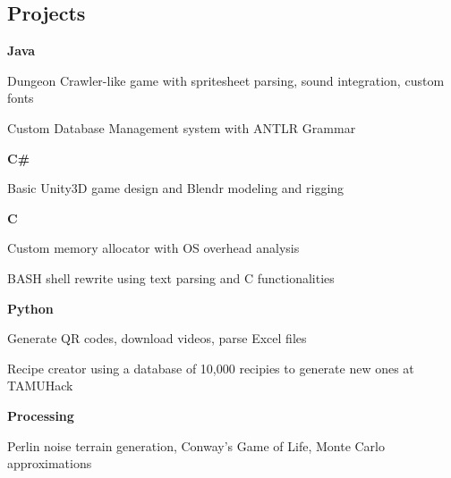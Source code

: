 \documentclass[10pt,letterpaper]{article}
\newenvironment{indentsection}[1]%
{\begin{list}{}%
	{\setlength{\leftmargin}{#1}}%
	\item[]%
}
{\end{list}}
\newcommand{\CPP}
{C\nolinebreak[4]\hspace{-.05em}\raisebox{.22ex}{\footnotesize\bf ++}}
\begin{document}
\subsection*{Projects}
\begin{indentsection}{\parindent}
	\begin{itemize*}
	\item \textbf{Java} 
	\vspace{-0.2em}
		\begin{itemize*}
			\item Dungeon Crawler-like game with spritesheet parsing, sound integration, custom fonts 
			\item Custom Database Management system with ANTLR Grammar 
		\end{itemize*}
	\item \textbf{C\#} 
	\vspace{-0.2em}
		\begin{itemize*}
			\item Basic Unity3D game design and Blendr modeling and rigging 
		\end{itemize*}
	\item \textbf{\CPP}
	\vspace{-0.2em}
		\begin{itemize*}
			\item Custom memory allocator with OS overhead analysis
			\item BASH shell rewrite using text parsing and C functionalities 
		\end{itemize*}
	\item \textbf{Python}
	\vspace{-0.2em}
		\begin{itemize*}
			\item Generate QR codes, download videos, parse Excel files
			\item Recipe creator using a database of 10,000 recipies to generate new ones at 				TAMUHack 
		\end{itemize*}
	\item \textbf{Processing}
	\vspace{-0.2em}
		\begin{itemize*}
			\item Perlin noise terrain generation, Conway's Game of Life, Monte Carlo 								approximations
		\end{itemize*}
	\end{itemize*}
\end{indentsection}
\end{document}
